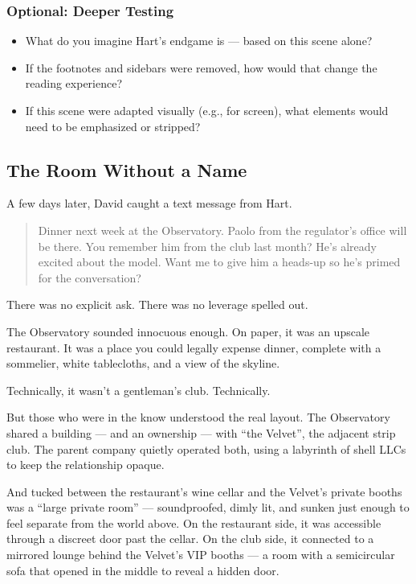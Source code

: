 \subsubsection{Optional: Deeper Testing}

\begin{itemize}
  \item What do you imagine Hart’s endgame is — based on this scene alone?
  \item If the footnotes and sidebars were removed, how would that change the reading experience?
  \item If this scene were adapted visually (e.g., for screen), what elements would need to be emphasized or stripped?
\end{itemize}






\subsection{The Room Without a Name}

A few days later, David caught a text message from Hart.

\begin{quote}
  Dinner next week at the Observatory. Paolo from the regulator’s office will be there. You remember him from the club 
  last month? He’s already excited about the model. Want me to give him a heads-up so he’s primed for the conversation?
\end{quote}

There was no explicit ask. There was no leverage spelled out.

The Observatory sounded innocuous enough. On paper, it was an upscale restaurant. It was a place you could legally expense 
dinner, complete with a sommelier, white tablecloths, and a view of the skyline.  

Technically, it wasn’t a gentleman’s club. Technically.

But those who were in the know understood the real layout. The Observatory shared a building --- and an ownership --- with 
``the Velvet'', the adjacent strip club. The parent company quietly operated both, using a labyrinth of shell 
LLCs to keep the relationship opaque.

And tucked between the restaurant’s wine cellar and the Velvet’s private booths was a “large private room” — soundproofed, 
dimly lit, and sunken just enough to feel separate from the world above. On the restaurant side, it was accessible through 
a discreet door past the cellar. On the club side, it connected to a mirrored lounge behind the Velvet’s VIP booths — a 
room with a semicircular sofa that opened in the middle to reveal a hidden door.

